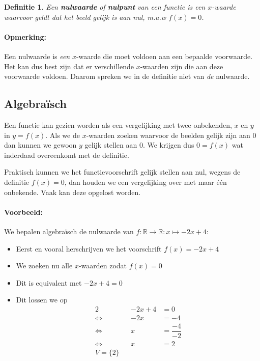 \documentclass[12pt,twoside]{article}
\newtheorem{definition}{Definitie}
\newcommand{\lra}{\ensuremath{\Leftrightarrow\qquad}}
\begin{document}
\begin{theorie}
  
\begin{definition}
  Een {\bf nulwaarde} of {\bf nulpunt} van een functie is een $x$-waarde waarvoor geldt dat het beeld gelijk is aan nul, m.a.w $f(x)=0$.
\end{definition}

\paragraph*{Opmerking:} Een nulwaarde is {\em een} $x$-waarde die moet voldoen aan een bepaalde voorwaarde. Het kan dus best zijn dat er verschillende $x$-waarden zijn die aan deze voorwaarde voldoen. Daarom spreken we in de definitie niet van {\em de} nulwaarde.

\subsection{Algebraïsch}

Een functie kan gezien worden als een vergelijking met twee onbekenden, $x$ en $y$ in $y=f(x)$. Als we de $x$-waarden zoeken waarvoor de beelden gelijk zijn aan $0$ dan kunnen we gewoon $y$ gelijk stellen aan $0$. We krijgen dus $0=f(x)$ wat inderdaad overeenkomt met de definitie.

Praktisch kunnen we het functievoorschrift gelijk stellen aan nul, wegens de definitie $f(x)=0$, dan houden we een vergelijking over met maar één onbekende. Vaak kan deze opgelost worden.

\paragraph{Voorbeeld:} We bepalen algebraïsch de nulwaarde van $f:\mathbb{R}\to\mathbb{R}:x\mapsto-2x+4$:

\begin{itemize}
\item Eerst en vooral herschrijven we het voorschrift $f(x)=-2x+4$
\item We zoeken nu alle $x$-waarden zodat $f(x)=0$
\item Dit is equivalent met $-2x+4=0$
\item Dit lossen we op
  \begin{alignat*}{2}
    && -2x+4 &= 0\\
    \lra &&   -2x &= -4\\
    \lra &&    x &= \dfrac{-4}{-2}\\
    \lra &&    x &= 2\\
    V=\{2\}
  \end{alignat*}
\end{itemize}


\end{theorie}
\end{document}
